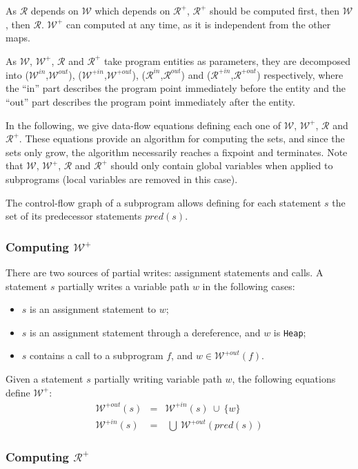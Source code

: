 \documentclass[fullpage]{article}
\newcommand{\code}[1]{\texttt{#1}}
\newcommand{\heap}{\code{Heap}\xspace}
\newcommand{\pred}[1]{\ensuremath{\mathit{pred}(#1)}\xspace}
\newcommand{\allwrites}{$\mathcal{W^+}$\xspace}
\newcommand{\Outallwrites}{\ensuremath{\mathcal{W}^{+out}}\xspace}
\newcommand{\Inallwrites}{\ensuremath{\mathcal{W}^{+in}}\xspace}
\newcommand{\inallwrites}[1]{\ensuremath{\mathcal{W}^{+in}(#1)}\xspace}
\newcommand{\outallwrites}[1]{\ensuremath{\mathcal{W}^{+out}(#1)}\xspace}
\newcommand{\writes}{$\mathcal{W}$\xspace}
\newcommand{\Outwrites}{\ensuremath{\mathcal{W}^{out}}\xspace}
\newcommand{\Inwrites}{\ensuremath{\mathcal{W}^{in}}\xspace}
\newcommand{\allreads}{$\mathcal{R^+}$\xspace}
\newcommand{\Outallreads}{\ensuremath{\mathcal{R}^{+out}}\xspace}
\newcommand{\Inallreads}{\ensuremath{\mathcal{R}^{+in}}\xspace}
\newcommand{\reads}{$\mathcal{R}$\xspace}
\newcommand{\Inreads}{\ensuremath{\mathcal{R}^{in}}\xspace}
\newcommand{\Outreads}{\ensuremath{\mathcal{R}^{out}}\xspace}
\newcommand{\union}{~\cup~}
\newcommand{\bigunion}{~\bigcup~}
\begin{document}
As \reads depends on \writes which depends on \allreads, \allreads should be
computed first, then \writes, then \reads. \allwrites can computed at any time, as it is independent from the other maps.

As \writes, \allwrites, \reads and
\allreads take program entities as parameters, they are decomposed into
(\Inwrites,\Outwrites), (\Inallwrites,\Outallwrites), (\Inreads,\Outreads) and
(\Inallreads,\Outallreads) respectively, where the ``in'' part describes the
program point immediately before the entity and the ``out'' part describes the
program point immediately after the entity.

In the following, we give data-flow equations defining each one of \writes,
\allwrites, \reads and \allreads. These equations provide an algorithm for
computing the sets, and since the sets only grow, the algorithm necessarily
reaches a fixpoint and terminates. Note that \writes, \allwrites, \reads and
\allreads should only contain global variables when applied to subprograms
(local variables are removed in this case).

The control-flow graph of a subprogram allows defining for each statement $s$
the set of its predecessor statements \pred{s}.

\subsubsection{Computing \allwrites}

There are two sources of partial writes: assignment statements and calls. A
statement $s$ partially writes a variable path $w$ in the following cases:
\begin{itemize}
\item $s$ is an assignment statement to $w$;
\item $s$ is an assignment statement through a dereference, and $w$ is \heap;
\item $s$ contains a call to a subprogram $f$, and $w \in \outallwrites{f}$.
\end{itemize}

Given a statement $s$ partially writing variable path $w$, the following
equations define \allwrites:
\begin{eqnarray*}
\outallwrites{s} &=& \inallwrites{s} \union \{w\}\\
\inallwrites{s} &=& \bigunion \outallwrites{\pred{s}}
\end{eqnarray*}

\subsubsection{Computing \allreads}
\end{document}
